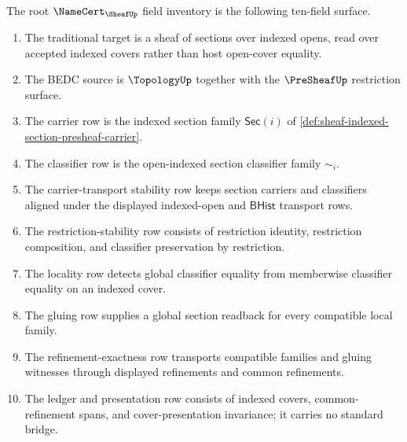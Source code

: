 \begin{definition}
\label{def:sheaf-root-namecert-field-inventory}
The root $\NameCert_{\SheafUp}$ field inventory is the following ten-field surface.
\begin{enumerate}
\item The traditional target is a sheaf of sections over indexed opens, read over accepted indexed covers rather than host open-cover equality.
\item The BEDC source is $\TopologyUp$ together with the $\PreSheafUp$ restriction surface.
\item The carrier row is the indexed section family $\mathsf{Sec}(i)$ of \autoref{def:sheaf-indexed-section-presheaf-carrier}.
\item The classifier row is the open-indexed section classifier family $\sim_i$.
\item The carrier-transport stability row keeps section carriers and classifiers aligned under the displayed indexed-open and $\mathsf{BHist}$ transport rows.
\item The restriction-stability row consists of restriction identity, restriction composition, and classifier preservation by restriction.
\item The locality row detects global classifier equality from memberwise classifier equality on an indexed cover.
\item The gluing row supplies a global section readback for every compatible local family.
\item The refinement-exactness row transports compatible families and gluing witnesses through displayed refinements and common refinements.
\item The ledger and presentation row consists of indexed covers, common-refinement spans, and cover-presentation invariance; it carries no standard bridge.
\end{enumerate}
\end{definition}

